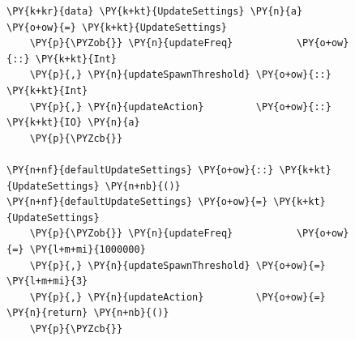 \begin{figure}[t]
  \centering










\begin{Verbatim}[commandchars=\\\{\}]
\PY{k+kr}{data} \PY{k+kt}{UpdateSettings} \PY{n}{a} \PY{o+ow}{=} \PY{k+kt}{UpdateSettings}
    \PY{p}{\PYZob{}} \PY{n}{updateFreq}           \PY{o+ow}{::} \PY{k+kt}{Int}
    \PY{p}{,} \PY{n}{updateSpawnThreshold} \PY{o+ow}{::} \PY{k+kt}{Int}
    \PY{p}{,} \PY{n}{updateAction}         \PY{o+ow}{::} \PY{k+kt}{IO} \PY{n}{a}
    \PY{p}{\PYZcb{}}

\PY{n+nf}{defaultUpdateSettings} \PY{o+ow}{::} \PY{k+kt}{UpdateSettings} \PY{n+nb}{()}
\PY{n+nf}{defaultUpdateSettings} \PY{o+ow}{=} \PY{k+kt}{UpdateSettings}
    \PY{p}{\PYZob{}} \PY{n}{updateFreq}           \PY{o+ow}{=} \PY{l+m+mi}{1000000}
    \PY{p}{,} \PY{n}{updateSpawnThreshold} \PY{o+ow}{=} \PY{l+m+mi}{3}
    \PY{p}{,} \PY{n}{updateAction}         \PY{o+ow}{=} \PY{n}{return} \PY{n+nb}{()}
    \PY{p}{\PYZcb{}}


\end{Verbatim}
\end{figure}
